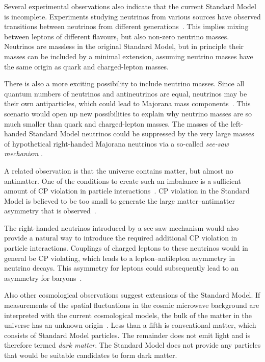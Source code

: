 Several experimental observations also indicate that the current Standard Model is incomplete. Experiments studying neutrinos from various
sources have observed transitions between neutrinos from different
generations~\cite{Fukuda:1998mi,*Ahmad:2002jz,*Eguchi:2002dm,*An:2012eh}. This implies mixing between leptons of different flavours, but
also non-zero neutrino masses. Neutrinos are massless in the original Standard Model, but in principle their masses can be included by a
minimal extension, assuming neutrino masses have the same origin as quark and charged-lepton masses.

There is also a more exciting possibility to include neutrino masses. Since all quantum numbers of neutrinos and antineutrinos are equal,
neutrinos may be their own antiparticles, which could lead to Majorana mass components~\cite{Majorana:1937vz}. This scenario would open up
new possibilities to explain why neutrino masses are so much smaller than quark and charged-lepton masses. The masses of the left-handed
Standard Model neutrinos could be suppressed by the very large masses of hypothetical right-handed Majorana neutrinos via a so-called
\emph{see-saw mechanism} \cite{Minkowski:1977sc}.

A related observation is that the universe contains matter, but almost no antimatter. One of the conditions to create such an imbalance is
a sufficient amount of CP violation in particle interactions~\cite{Sakharov:1967dj}. CP violation in the Standard Model is believed to be
too small to generate the large matter--antimatter asymmetry that is observed~\cite{Gavela:1993ts,*Huet:1994jb,*Gavela:1994dt}.

The right-handed neutrinos introduced by a see-saw mechanism would also provide a natural way to introduce the required additional CP
violation in particle interactions. Couplings of charged leptons to these neutrinos would in general be CP violating, which leads to a
lepton--antilepton asymmetry in neutrino decays. This asymmetry for leptons could subsequently lead to an asymmetry for
baryons~\cite{Kuzmin:1985mm,*Fukugita:1986hr}.

Also other cosmological observations suggest extensions of the Standard Model. If measurements of the spatial fluctuations in the cosmic
microwave background are interpreted with the current cosmological models, the bulk of the matter in the universe has an unknown
origin~\cite{Hinshaw:2012aka}. Less than a fifth is conventional matter, which consists of Standard Model particles. The remainder does not
emit light and is therefore termed \emph{dark matter}. The Standard Model does not provide any particles that would be suitable candidates
to form dark matter.

